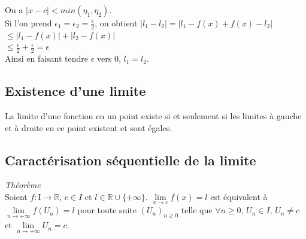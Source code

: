 \documentclass[a4paper,10pt]{book} %
\newcommand{\R}{\mathbb{R}}
\begin{document}
On a $|x-c|<min(\eta_{1},\eta_{2})$.\\

Si l'on prend $\epsilon_{1}=\epsilon_{2}=\frac{\epsilon}{2}$, on obtient $|l_{1}-l_{2}|=|l_{1}-f(x)+f(x)-l_{2}|$\\
\hspace*{7,4cm} $\leq |l_{1}-f(x)| + |l_{2}-f(x)|$ \\
\hspace*{7,4cm} $\leq \frac{\epsilon}{2}+\frac{\epsilon}{2}=\epsilon$\\

Ainsi en faisant tendre $\epsilon$ vers 0, $l_{1}=l_{2}$.

\subsection{Existence d'une limite}
La limite d'une fonction en un point existe si et seulement si les limites à gauche et à droite en ce point existent et sont égales.

\subsection{Caractérisation séquentielle de la limite}
\emph{Théorème}\\
Soient $f : $I$ \rightarrow \R$, $c\in I$ et $l\in \R\cup\{+\infty\}$. $\lim\limits_{x\rightarrow c} f(x)=l$ est équivalent à $\lim\limits_{n\rightarrow +\infty} f(U_{n})=l$ pour toute suite $(U_{n})_{n\geq 0}$ telle que $\forall n \geq 0$, $U_{n} \in I$,  $U_{n}\neq c$ et $\lim\limits_{n\rightarrow +\infty} U_{n}=c$.
\end{document}
